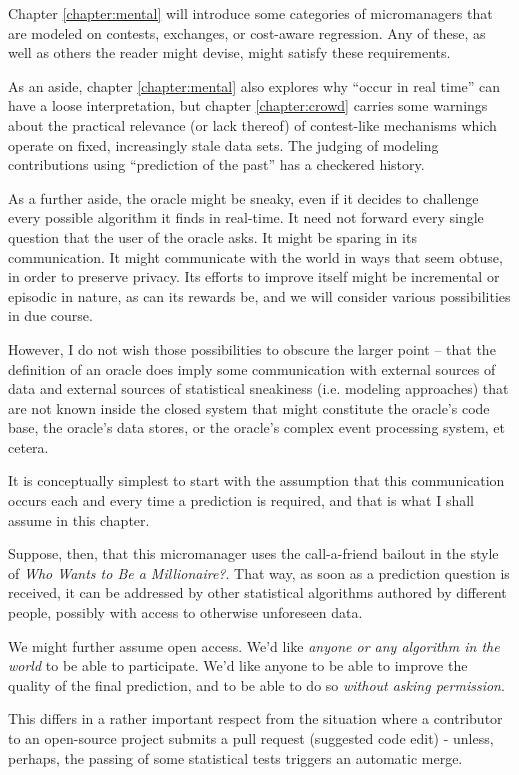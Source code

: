 Chapter \ref{chapter:mental} will introduce some categories of micromanagers that are modeled on contests, exchanges, or cost-aware regression. Any of these, as well as others the reader might devise, might satisfy these requirements. 

As an aside, chapter \ref{chapter:mental} also explores why ``occur in real time'' can have a loose interpretation, but chapter \ref{chapter:crowd} carries some warnings about the practical relevance (or lack thereof) of contest-like mechanisms which operate on fixed, increasingly stale data sets. The judging of modeling contributions using ``prediction of the past'' has a checkered history.


As a further aside, the oracle might be sneaky, even if it decides to challenge every possible algorithm it finds in real-time. It need not forward every single question that the user of the oracle asks. It might be sparing in its communication. It might communicate with the world in ways that seem obtuse, in order to preserve privacy. Its efforts to improve itself might be incremental or episodic in nature, as can its rewards be, and we will consider various possibilities in due course. 

However, I do not wish those possibilities to obscure the larger point -- that the definition of an oracle does imply some communication with external sources of data and external sources of statistical sneakiness (i.e. modeling approaches) that are not known inside the closed system that might constitute the oracle's code base, the oracle's data stores, or the oracle's complex event processing system, et cetera.    


It is conceptually simplest to start with the assumption that this communication occurs each and every time a prediction is required, and that is what I shall assume in this chapter.

Suppose, then, that this micromanager uses the call-a-friend bailout in the style of {\em Who Wants to Be a Millionaire?}. That way, as soon as a prediction question is received, it can be addressed by other statistical algorithms authored by different people, possibly with access to otherwise unforeseen data. 

We might further assume open access. We'd like {\em anyone or any algorithm in the world} to be able to participate. We'd like anyone to be able to improve the quality of the final prediction, and to be able to do so {\em without asking permission}. 

This differs in a rather important respect from the situation where a contributor to an open-source project submits a pull request (suggested code edit) - unless, perhaps, the passing of some statistical tests triggers an automatic merge. 

